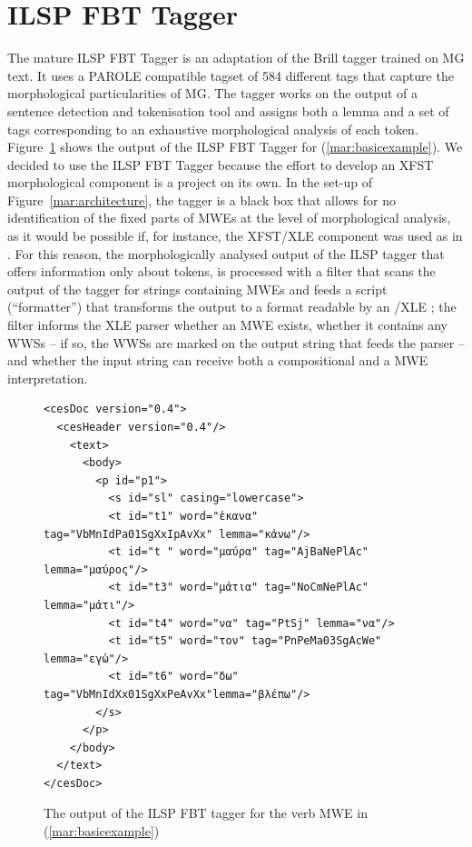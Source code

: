 \documentclass[output=paper]{langsci/langscibook}
\begin{document}
\section{ILSP FBT Tagger}
The mature ILSP FBT Tagger \citep{papageorgiou2000} is an adaptation of the Brill tagger trained on MG text. It uses a PAROLE compatible tagset \citep{bilgram-keson:1998:nodalida} of 584 different tags that capture the morphological particularities of MG. The tagger works on the output of a sentence detection and tokenisation tool and assigns both a lemma and a set of tags corresponding to an exhaustive morphological analysis of each token. Figure~\ref{mar:Sfig2} shows the output of the ILSP FBT Tagger for (\ref{mar:basicexample}).
We decided to use the ILSP FBT Tagger because the effort to develop an XFST morphological component is a project on its own. In the set-up of Figure~\ref{mar:architecture}, the tagger is a black box that allows for no identification of the fixed parts of MWEs at the level of morphological analysis, as it would be possible if, for instance, the XFST/XLE component was used as in \cite{attia2006}. For this reason, the morphologically analysed output of the ILSP tagger that offers information only about tokens, is processed with a filter \citep{samaridi2014} that scans the output of the tagger for strings containing MWEs and feeds a script (``formatter'') that transforms the output to a format readable by an /XLE ; the filter informs the XLE parser whether an MWE exists, whether it contains any WWSs -- if so, the WWSs are marked on the output string that feeds the parser -- and whether the input string can receive both a compositional and a MWE interpretation.
\begin{figure}[h!]
  \caption{\label{mar:Sfig2}The output of the ILSP FBT tagger for the verb MWE in (\ref{mar:basicexample})}
  \centering
\begin{Verbatim}[fontsize=\small]
<cesDoc version="0.4">
  <cesHeader version="0.4"/>
    <text>
      <body>
        <p id="p1">
          <s id="sl" casing="lowercase">
          <t id="t1" word="ἑκανα" tag="VbMnIdPa01SgXxIpAvXx" lemma="κἀνω"/>
          <t id="t " word="μαύρα" tag="AjBaNePlAc" lemma="μαύρος"/>
          <t id="t3" word="μἀτια" tag="NoCmNePlAc" lemma="μἀτι"/>
          <t id="t4" word="να" tag="PtSj" lemma="να"/>
          <t id="t5" word="τον" tag="PnPeMa03SgAcWe" lemma="εγὡ"/>
          <t id="t6" word="δω" tag="VbMnIdXx01SgXxPeAvXx"lemma="βλέπω"/>
        </s>
      </p>
    </body>
  </text>
</cesDoc>
\end{Verbatim}
\end{figure}
\end{document}
